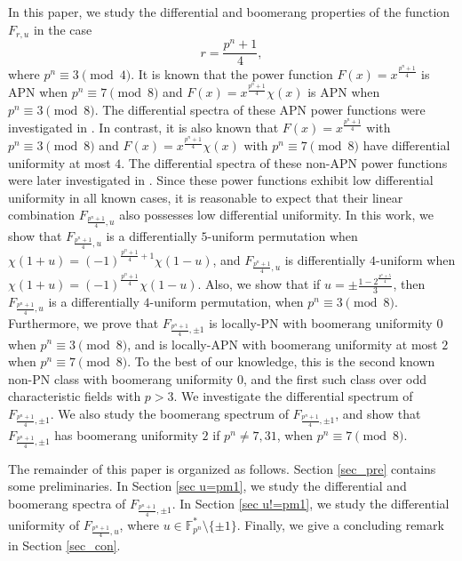 \documentclass[11pt]{article}
\numberwithin{theorem}{section}
\newcommand{\Fpnmul}{\mathbb{F}_{p^n}^*}
\begin{document}
In this paper, we study the differential and boomerang properties of the function $F_{r,u}$ in the case
\begin{equation*}
	r=\frac{p^n+1}{4},
\end{equation*}
where $p^n\equiv 3\pmod{4}$. It is known \cite{HRS99} that the power function $F(x)=x^{\frac{p^n+1}{4}}$ is APN when $p^n\equiv 7\pmod{8}$ and $F(x)=x^{\frac{p^n+1}{4}} \chi(x)$ is APN when $p^n\equiv 3\pmod{8}$. The differential spectra of these APN power functions were investigated in \cite{TY23}. In contrast, it is also known \cite{XCX16} that $F(x) = x^{\frac{p^n+1}{4}}$ with $p^n \equiv 3 \pmod{8}$ and $F(x) = x^{\frac{p^n+1}{4}} \chi(x)$ with $p^n \equiv 7 \pmod{8}$ have differential uniformity at most $4$. The differential spectra of these non-APN power functions were later investigated in \cite{BXC+25}. Since these power functions exhibit low differential uniformity in all known cases, it is reasonable to expect that their linear combination $F_{\frac{p^n+1}{4},u}$ also possesses low differential uniformity. In this work, we show that $F_{\frac{p^n+1}{4},u}$ is a differentially $5$-uniform permutation when $\chi(1+u) = (-1)^{\frac{p^n+1}{4}+1} \chi(1-u)$, and $F_{\frac{p^n+1}{4},u}$ is differentially $4$-uniform when $\chi(1+u) = (-1)^{\frac{p^n+1}{4}} \chi(1-u)$. Also, we show that if $u=\pm \frac{1-2^{\frac{p^n+5}{4}}}{3}$, then $F_{\frac{p^n+1}{4}, u}$ is a differentially $4$-uniform permutation, when $p^n\equiv 3 \pmod{8}$. Furthermore, we prove that $F_{\frac{p^n+1}{4},\pm1}$ is locally-PN with boomerang uniformity $0$ when $p^n\equiv 3\pmod{8}$, and is locally-APN with boomerang uniformity at most $2$ when $p^n \equiv 7 \pmod{8}$. To the best of our knowledge, this is the second known non-PN class with boomerang uniformity $0$, and the first such class over odd characteristic fields with $p > 3$. We investigate the differential spectrum of $F_{\frac{p^n+1}{4},\pm 1}$. We also study the boomerang spectrum of $F_{\frac{p^n+1}{4},\pm 1}$, and show that $F_{\frac{p^n+1}{4},\pm 1}$ has boomerang uniformity $2$ if $p^n\ne 7, 31$,  when $p^n \equiv 7 \pmod{8}$.

The remainder of this paper is organized as follows. Section \ref{sec_pre} contains some preliminaries. In Section \ref{sec u=pm1}, we study the differential and boomerang spectra of $F_{\frac{p^n+1}{4},\pm 1}$. In Section \ref{sec u!=pm1}, we study the differential uniformity of $F_{\frac{p^n+1}{4},u}$, where $u\in \Fpnmul \setminus \{\pm1\}$. Finally, we give a concluding remark in Section \ref{sec_con}.
\end{document}
